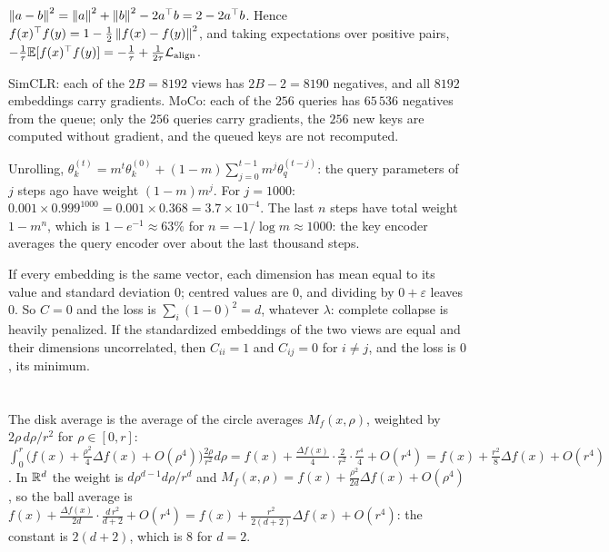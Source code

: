 $\left\|a - b\right\|^2 = \left\|a\right\|^2 + \left\|b\right\|^2 - 2a^\top b = 2 - 2a^\top b$. Hence $f(x)^\top f(y) = 1 - \frac12\left\|f(x) - f(y)\right\|^2$, and taking expectations over positive pairs,
$-\frac1\tau\mathbb{E}[f(x)^\top f(y)] = -\frac1\tau + \frac1{2\tau}\mathcal L_{\mathrm{align}}$.

SimCLR: each of the $2B = 8192$ views has $2B - 2 = 8190$ negatives, and all $8192$ embeddings carry gradients.
MoCo: each of the $256$ queries has $65\,536$ negatives from the queue; only the $256$ queries carry gradients, the $256$ new
keys are computed without gradient, and the queued keys are not recomputed.

Unrolling, $\theta_k^{(t)} = m^t\theta_k^{(0)} + (1 - m)\sum_{j=0}^{t-1}m^j\theta_q^{(t-j)}$: the query parameters of $j$ steps ago have weight $(1 - m)m^j$. For $j = 1000$:
$0.001\times0.999^{1000} = 0.001\times0.368 = 3.7\times10^{-4}$. The last $n$ steps have total weight $1 - m^n$, which is $1 - e^{-1}\approx63\%$ for
$n = -1/\log m\approx1000$: the key encoder averages the query encoder over about the last thousand steps.

If every embedding is the same vector, each dimension has mean equal to its value and standard
deviation $0$; centred values are $0$, and dividing by $0 + \varepsilon$ leaves $0$. So $C = 0$ and the loss is $\sum_i(1 - 0)^2 = d$, whatever $\lambda$:
complete collapse is heavily penalized. If the standardized embeddings of the two views are equal and
their dimensions uncorrelated, then $C_{ii} = 1$ and $C_{ij} = 0$ for $i\neq j$, and the loss is $0$, its minimum.

\providecommand{\bD}{\mathbf{D}}\providecommand{\bI}{\mathbf{I}}\providecommand{\bL}{\mathbf{L}}
\providecommand{\bone}{\mathbf{1}}\providecommand{\bv}{\mathbf{v}}\providecommand{\bx}{\mathbf{x}}
\providecommand{\by}{\mathbf{y}}
\section{}

The disk average is the average of the circle averages $M_f(x, \rho)$, weighted by $2\rho\,d\rho/r^2$ for $\rho\in[0, r]$:
$\int_0^r\bigl(f(x) + \frac{\rho^2}4\Delta f(x) + O(\rho^4)\bigr)\frac{2\rho}{r^2}d\rho = f(x) + \frac{\Delta f(x)}4\cdot\frac2{r^2}\cdot\frac{r^4}4 + O(r^4) = f(x) + \frac{r^2}8\Delta f(x) + O(r^4)$. In $\mathbb{R}^d$ the weight is
$d\rho^{d-1}d\rho/r^d$ and $M_f(x, \rho) = f(x) + \frac{\rho^2}{2d}\Delta f(x) + O(\rho^4)$, so the ball average is $f(x) + \frac{\Delta f(x)}{2d}\cdot\frac{d\,r^2}{d + 2} + O(r^4) = f(x) + \frac{r^2}{2(d+2)}\Delta f(x) + O(r^4)$: the constant is
$2(d + 2)$, which is $8$ for $d = 2$.

